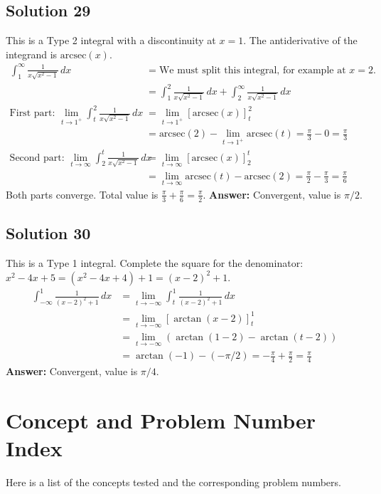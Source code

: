 \documentclass{article}
\begin{document}
\subsection*{Solution 29}
This is a Type 2 integral with a discontinuity at $x=1$. The antiderivative of the integrand is $\text{arcsec}(x)$.
\begin{align*}
\int_{1}^{\infty} \frac{1}{x\sqrt{x^2-1}} \,dx &= \text{We must split this integral, for example at } x=2. \\
&= \int_{1}^{2} \frac{1}{x\sqrt{x^2-1}} \,dx + \int_{2}^{\infty} \frac{1}{x\sqrt{x^2-1}} \,dx \\
\text{First part: } \lim_{t \to 1^+} \int_{t}^{2} \frac{1}{x\sqrt{x^2-1}} \,dx &= \lim_{t \to 1^+} [\text{arcsec}(x)]_{t}^{2} \\
&= \text{arcsec}(2) - \lim_{t \to 1^+} \text{arcsec}(t) = \frac{\pi}{3} - 0 = \frac{\pi}{3} \\
\text{Second part: } \lim_{t \to \infty} \int_{2}^{t} \frac{1}{x\sqrt{x^2-1}} \,dx &= \lim_{t \to \infty} [\text{arcsec}(x)]_{2}^{t} \\
&= \lim_{t \to \infty} \text{arcsec}(t) - \text{arcsec}(2) = \frac{\pi}{2} - \frac{\pi}{3} = \frac{\pi}{6}
\end{align*}
Both parts converge. Total value is $\frac{\pi}{3} + \frac{\pi}{6} = \frac{\pi}{2}$.
\textbf{Answer:} Convergent, value is $\pi/2$.

\subsection*{Solution 30}
This is a Type 1 integral. Complete the square for the denominator: $x^2-4x+5 = (x^2-4x+4)+1 = (x-2)^2+1$.
\begin{align*}
\int_{-\infty}^{1} \frac{1}{(x-2)^2+1} \,dx &= \lim_{t \to -\infty} \int_{t}^{1} \frac{1}{(x-2)^2+1} \,dx \\
&= \lim_{t \to -\infty} [\arctan(x-2)]_{t}^{1} \\
&= \lim_{t \to -\infty} (\arctan(1-2) - \arctan(t-2)) \\
&= \arctan(-1) - (-\pi/2) = -\frac{\pi}{4} + \frac{\pi}{2} = \frac{\pi}{4}
\end{align*}
\textbf{Answer:} Convergent, value is $\pi/4$.

\newpage

\section*{Concept and Problem Number Index}
Here is a list of the concepts tested and the corresponding problem numbers.
\end{document}
